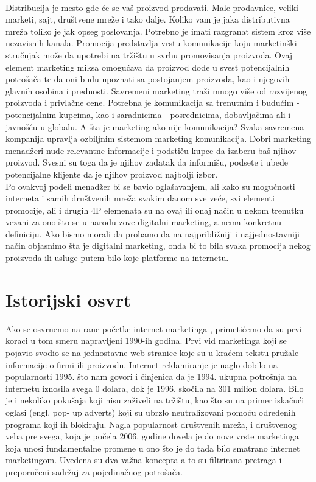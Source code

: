 \documentclass[a4paper]{article}
\begin{document}
{\\ Distribucija je mesto gde će se vaš proizvod prodavati. Male prodavnice, veliki marketi, sajt, društvene mreže i tako dalje. Koliko vam je jaka distributivna mreža toliko je jak opseg poslovanja. Potrebno je imati razgranat sistem kroz više nezavisnih kanala. Promocija predstavlja vrstu komunikacije koju marketinški stručnjak može da upotrebi na tržištu u svrhu promovisanja proizvoda. Ovaj element marketing miksa omogućava da proizvod dođe u svest potencijalnih potrošača te da oni budu upoznati sa postojanjem proizvoda, kao i njegovih glavnih osobina i prednosti. Savremeni marketing traži mnogo više od razvijenog proizvoda i privlačne cene. Potrebna je komunikacija sa trenutnim i budućim - potencijalnim kupcima, kao i saradnicima - posrednicima, dobavljačima ali i javnošću u globalu. A šta je marketing ako nije komunikacija? Svaka savremena kompanija upravlja ozbiljnim sistemom marketing komunikacija. Dobri marketing menadžeri nude relevantne informacije i podstiču kupce da izaberu baš njihov proizvod. Svesni su toga da je njihov zadatak da informišu, podsete i ubede potencijalne klijente da je njihov proizvod najbolji izbor.
\\ Po ovakvoj podeli menadžer bi se bavio oglašavanjem, ali kako su mogućnosti interneta i samih društvenih mreža svakim danom sve veće, svi elementi promocije, ali i drugih 4P elemenata su na ovaj ili onaj način u nekom trenutku vezani za ono što se u narodu zove digitalni marketing, a nema konkretnu definiciju. Ako bismo morali da probamo da na najpribližniji i najjednostavniji način objasnimo šta je digitalni marketing, onda bi to bila svaka promocija nekog proizvoda ili usluge putem bilo koje platforme na internetu.
\cite{uvod}
\newpage

\section{Istorijski osvrt}
\label{sec: Istorijski osvrt}
Ako se osvrnemo na rane početke internet marketinga , primetićemo da su prvi koraci u tom smeru napravljeni 1990-ih godina. Prvi vid marketinga koji se pojavio svodio se na jednostavne web stranice koje su u kraćem tekstu pružale informacije o firmi ili proizvodu. Internet reklamiranje je naglo dobilo na popularnosti 1995. što nam govori i činjenica da je 1994. ukupna potrošnja na internetu iznosila svega 0 dolara, dok je 1996. skočila na 301 milion dolara.
Bilo je i nekoliko pokušaja koji nisu zaživeli na tržištu, kao što su na primer iskačući oglasi (engl. pop- up adverts) koji su ubrzlo neutralizovani pomoću određenih programa koji ih blokiraju.
Nagla popularnost društvenih mreža, i društvenog veba pre svega, koja je počela 2006. godine dovela je do nove vrste marketinga koja unosi fundamentalne promene u ono što je do tada bilo smatrano internet marketingom. Uvedena su dva važna koncepta a to su filtrirana pretraga i preporučeni sadržaj za pojedinačnog potrošača.
}
\end{document}
